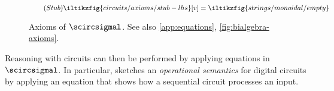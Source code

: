 \begin{figure*}
    \begin{minipage}[b]{0.22\textwidth}
        \begin{equation}
            \tag{\(\mathsf{Stub}\)}
            \iltikzfig{circuits/axioms/stub-lhs}[v]
            =
            \iltikzfig{strings/monoidal/empty}
            \label{eq:stub}
        \end{equation}
    \end{minipage}
    \begin{minipage}[b]{0.3\textwidth}
        \forkgateeqn
    \end{minipage}
    \begin{minipage}[b]{0.25\textwidth}
        \stubgateeqn
    \end{minipage}
    \begin{minipage}[b]{0.25\textwidth}
        \stubdelayeqn
    \end{minipage}
    \begin{minipage}[b]{0.22\textwidth}
        \forkjoininverseeqn
    \end{minipage}
    \begin{minipage}[b]{0.4\textwidth}
        \streamingeqn
    \end{minipage}
    \begin{minipage}[b]{0.25\textwidth}
        \disconnecteqn
    \end{minipage}
    \begin{minipage}[b]{0.25\textwidth}
        \forkdelayeqn
    \end{minipage}
    \begin{minipage}[b]{0.25\textwidth}
        \joindelayeqn
    \end{minipage}
    \begin{minipage}[b]{0.3\textwidth}
        \instantfeedbackeqn
    \end{minipage}
    \begin{minipage}[b]{0.35\textwidth}
        \delaydiscardeqn
    \end{minipage}
    \caption{
        Axioms of \(\scircsigmal\).
        See also \cref{app:equations}, \cref{fig:bialgebra-axioms}.
    }
    \label{fig:local-equations}
\end{figure*}

Reasoning with circuits can then be performed by applying equations in
\(\scircsigmal\).
In particular, \cite{ghica2022compositional} sketches an
\emph{operational semantics} for digital circuits by applying an equation
that shows how a sequential circuit processes an input.


